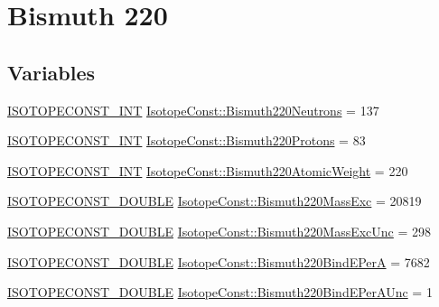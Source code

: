 \hypertarget{group___isotope_const-_bismuth-_bi220}{}\section{Bismuth 220}
\label{group___isotope_const-_bismuth-_bi220}
\subsection*{Variables}
\begin{DoxyCompactItemize}
\item 
\mbox{\hyperlink{group___isotope_const-_macros_ga5f18360b3e99483a35c32d789e62621c}{I\+S\+O\+T\+O\+P\+E\+C\+O\+N\+S\+T\+\_\+\+I\+NT}} \mbox{\hyperlink{group___isotope_const-_bismuth-_bi220_ga147fcbf0afda8f462b3c6b02803d02a2}{Isotope\+Const\+::\+Bismuth220\+Neutrons}} = 137
\item 
\mbox{\hyperlink{group___isotope_const-_macros_ga5f18360b3e99483a35c32d789e62621c}{I\+S\+O\+T\+O\+P\+E\+C\+O\+N\+S\+T\+\_\+\+I\+NT}} \mbox{\hyperlink{group___isotope_const-_bismuth-_bi220_gae932cf481b2de9f06b8bf831b2d5b05d}{Isotope\+Const\+::\+Bismuth220\+Protons}} = 83
\item 
\mbox{\hyperlink{group___isotope_const-_macros_ga5f18360b3e99483a35c32d789e62621c}{I\+S\+O\+T\+O\+P\+E\+C\+O\+N\+S\+T\+\_\+\+I\+NT}} \mbox{\hyperlink{group___isotope_const-_bismuth-_bi220_ga4e3bae29bf3714aa455ced512d1f35c7}{Isotope\+Const\+::\+Bismuth220\+Atomic\+Weight}} = 220
\item 
\mbox{\hyperlink{group___isotope_const-_macros_ga8f45a7272ce02c0b4c65c44636ed719a}{I\+S\+O\+T\+O\+P\+E\+C\+O\+N\+S\+T\+\_\+\+D\+O\+U\+B\+LE}} \mbox{\hyperlink{group___isotope_const-_bismuth-_bi220_ga41389752bfafb94b7ef9f1679fd94555}{Isotope\+Const\+::\+Bismuth220\+Mass\+Exc}} = 20819
\item 
\mbox{\hyperlink{group___isotope_const-_macros_ga8f45a7272ce02c0b4c65c44636ed719a}{I\+S\+O\+T\+O\+P\+E\+C\+O\+N\+S\+T\+\_\+\+D\+O\+U\+B\+LE}} \mbox{\hyperlink{group___isotope_const-_bismuth-_bi220_ga321a1291790df5aa1faf29530b1583fc}{Isotope\+Const\+::\+Bismuth220\+Mass\+Exc\+Unc}} = 298
\item 
\mbox{\hyperlink{group___isotope_const-_macros_ga8f45a7272ce02c0b4c65c44636ed719a}{I\+S\+O\+T\+O\+P\+E\+C\+O\+N\+S\+T\+\_\+\+D\+O\+U\+B\+LE}} \mbox{\hyperlink{group___isotope_const-_bismuth-_bi220_ga04511ebdc4595301bd1bb63f830dd49a}{Isotope\+Const\+::\+Bismuth220\+Bind\+E\+PerA}} = 7682
\item 
\mbox{\hyperlink{group___isotope_const-_macros_ga8f45a7272ce02c0b4c65c44636ed719a}{I\+S\+O\+T\+O\+P\+E\+C\+O\+N\+S\+T\+\_\+\+D\+O\+U\+B\+LE}} \mbox{\hyperlink{group___isotope_const-_bismuth-_bi220_ga059cae2073f31890934c8bf4647d1900}{Isotope\+Const\+::\+Bismuth220\+Bind\+E\+Per\+A\+Unc}} = 1

\end{DoxyCompactItemize}
